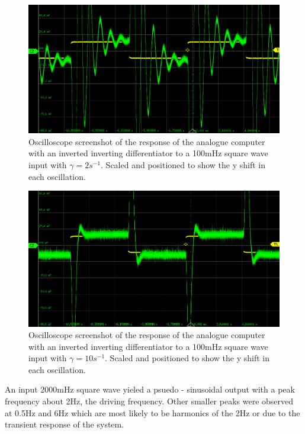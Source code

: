 \documentclass[journal]{Imperial_lab_report}
\begin{document}
    \begin{figure}
        \label{fig: G 2 100 Diff zoom}
        \centering
        \includegraphics[scale = 0.25]{S_100_zoom.png}
        \caption{Oscilloscope screenshot of the response of the analogue computer with an inverted inverting differentiator to a 100mHz square wave input with $\gamma=2$$s^{-1}$. Scaled and positioned to show the y shift in each oscillation.}
    \end{figure}

    \begin{figure}
        \centering
        \includegraphics[scale = 0.25]{G_10_zoom.png}
        \caption{ Oscilloscope screenshot of the response of the analogue computer with an inverted inverting differentiator to a 100mHz square wave input with $\gamma=10$$s^{-1}$. Scaled and positioned to show the y shift in each oscillation.}
    \end{figure}
    An input 2000mHz square wave yieled a psuedo - sinusoidal output with a peak frequency about 2Hz, the driving frequency. Other smaller peaks were observed at 0.5Hz and 6Hz which are most likely to be harmonics of the 2Hz or due to the transient response of the system. 
\end{document}
